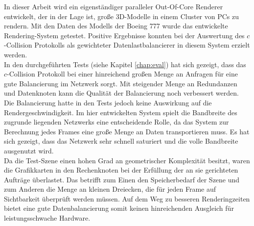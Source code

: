 In dieser Arbeit wird ein eigenständiger paralleler Out-Of-Core Renderer entwickelt, der in der Lage ist, große 3D-Modelle in einem Cluster von PCs zu rendern. Mit den Daten des Modells der Boeing 777 wurde das entwickelte Rendering-System getestet. Positive Ergebnisse konnten bei der Auswertung des $c$-Collision Protokolls als gewichteter Datenlastbalancierer in diesem System erzielt werden. \\
In den durchgeführten Tests (siehe Kapitel \ref{chap:eval}) hat sich gezeigt, dass das $c$-Collision Protokoll bei einer hinreichend großen Menge an Anfragen für eine gute Balancierung im Netzwerk sorgt. Mit steigender Menge an Redundanzen und Datenknoten kann die Qualität der Balancierung noch verbessert werden. Die Balancierung hatte in den Tests jedoch keine Auswirkung auf die Rendergeschwindigkeit. Im hier entwickelten System spielt die Bandbreite des zugrunde liegenden Netzwerks eine entscheidende Rolle, da das System zur Berechnung jedes Frames eine große Menge an Daten transportieren muss. Es hat sich gezeigt, dass das Netzwerk sehr schnell saturiert und die volle Bandbreite ausgenutzt wird. \\
Da die Test-Szene einen hohen Grad an geometrischer Komplexität besitzt, waren die Grafikkarten in den Rechenknoten bei der Erfüllung der an sie gerichteten Aufträge überlastet. Das betrifft zum Einen den Speicherbedarf der Szene und zum Anderen die Menge an kleinen Dreiecken, die für jeden Frame auf Sichtbarkeit überprüft werden müssen. Auf dem Weg zu besseren Renderingzeiten bietet eine gute Datenbalancierung somit keinen hinreichenden Ausgleich für leistungsschwache Hardware. 

